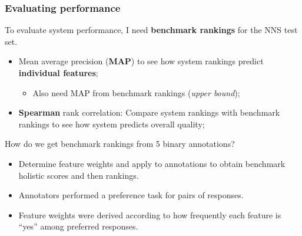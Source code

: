 \documentclass[handout,xcolor={dvipsnames}]{beamer}
\begin{document}
\begin{frame}
\frametitle{Evaluating performance}

To evaluate system performance, I need \textbf{benchmark rankings} for the NNS test set. \\

\begin{itemize}
\pause
\item Mean average precision (\textbf{MAP}) to see how system rankings predict \textbf{individual features};
\begin{itemize}
\item Also need MAP from benchmark rankings (\textit{upper bound});
\end{itemize}

\pause
\item \textbf{Spearman} rank correlation: Compare system rankings with benchmark rankings to see how system predicts overall quality;
\end{itemize}

\pause
How do we get benchmark rankings from 5 binary annotations? \\

\pause
\begin{itemize}
\item Determine feature weights and apply to annotations to obtain benchmark holistic scores and then rankings.
\pause
\item Annotators performed a preference task for pairs of responses.
\pause
\item Feature weights were derived according to how frequently each feature is ``yes'' among preferred responses. 
\end{itemize}
\end{frame}
\end{document}
